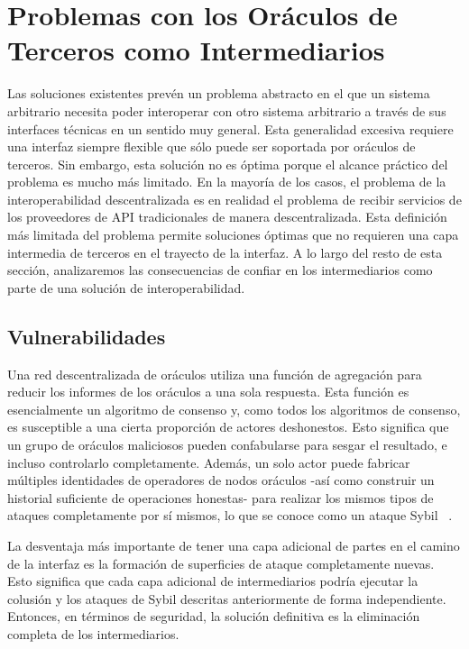 \documentclass[11pt]{article}
\begin{document}
\section{Problemas con los Oráculos de Terceros como Intermediarios}
\label{sec:issues-with-third-party-oracles-as-middlemen}

Las soluciones existentes prevén un problema abstracto en el que un sistema arbitrario necesita poder interoperar con otro sistema arbitrario a través de sus interfaces técnicas en un sentido muy general. Esta generalidad excesiva requiere una interfaz siempre flexible que sólo puede ser soportada por oráculos de terceros. Sin embargo, esta solución no es óptima porque el alcance práctico del problema es mucho más limitado. En la mayoría de los casos, el problema de la interoperabilidad descentralizada es en realidad el problema de recibir servicios de los proveedores de API tradicionales de manera descentralizada. Esta definición más limitada del problema permite soluciones óptimas que no requieren una capa intermedia de terceros en el trayecto de la interfaz. A lo largo del resto de esta sección, analizaremos las consecuencias de confiar en los intermediarios como parte de una solución de interoperabilidad.

\subsection{Vulnerabilidades}
\label{sec:vulnerability}

Una red descentralizada de oráculos utiliza una función de agregación para reducir los informes de los oráculos a una sola respuesta. Esta función es esencialmente un algoritmo de consenso y, como todos los algoritmos de consenso, es susceptible a una cierta proporción de actores deshonestos. Esto significa que un grupo de oráculos maliciosos pueden confabularse para sesgar el resultado, e incluso controlarlo completamente. Además, un solo actor puede fabricar múltiples identidades de operadores de nodos oráculos -así como construir un historial suficiente de operaciones honestas- para realizar los mismos tipos de ataques completamente por sí mismos, lo que se conoce como un ataque Sybil ~\cite{douceur:2002}.

La desventaja más importante de tener una capa adicional de partes en el camino de la interfaz es la formación de superficies de ataque completamente nuevas. Esto significa que cada capa adicional de intermediarios podría ejecutar la colusión y los ataques de Sybil descritas anteriormente de forma independiente. Entonces, en términos de seguridad, la solución definitiva es la eliminación completa de los intermediarios.
\end{document}
